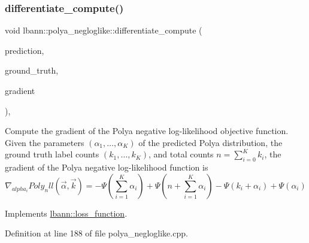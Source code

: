 \subsubsection{\texorpdfstring{differentiate\+\_\+compute()}{differentiate\_compute()}}
{\footnotesize\ttfamily void lbann\+::polya\+\_\+negloglike\+::differentiate\+\_\+compute (\begin{DoxyParamCaption}\item[{const \hyperlink{base_8hpp_a9a697a504ae84010e7439ffec862b470}{Abs\+Dist\+Mat} \&}]{prediction,  }\item[{const \hyperlink{base_8hpp_a9a697a504ae84010e7439ffec862b470}{Abs\+Dist\+Mat} \&}]{ground\+\_\+truth,  }\item[{\hyperlink{base_8hpp_a9a697a504ae84010e7439ffec862b470}{Abs\+Dist\+Mat} \&}]{gradient }\end{DoxyParamCaption})\hspace{0.3cm}{\ttfamily [override]}, {\ttfamily [virtual]}}

Compute the gradient of the Polya negative log-\/likelihood objective function. Given the parameters $(\alpha_1,\dots,\alpha_K)$ of the predicted Polya distribution, the ground truth label counts $(k_1,\dots,k_K)$, and total counts $n = \sum_{i=0}^K k_i$, the gradient of the Polya negative log-\/likelihood function is \[ \nabla_{alpha_i} Poly_nll(\vec{\alpha}, \vec{k}) = -\Psi(\sum_{i=1}^K \alpha_i) + \Psi(n + \sum_{i=1}^K \alpha_i) - \Psi(k_i + \alpha_i) + \Psi(\alpha_i) \] 

Implements \hyperlink{classlbann_1_1loss__function_aefccc2b4f5a02664002d12630cf369e7}{lbann\+::loss\+\_\+function}.



Definition at line 188 of file polya\+\_\+negloglike.\+cpp.


